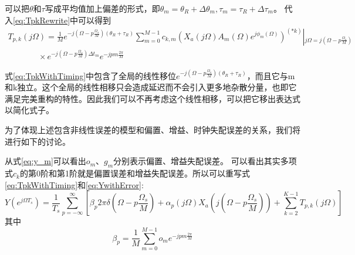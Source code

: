 		可以把$\theta $和$\tau $写成平均值加上偏差的形式，即${\theta _m} = {\theta _R} + \Delta {\theta _m},{\tau _m} = {\tau _R} + \Delta {\tau _m}$。
		代入\ref{eq:TpkRewrite}中可以得到
		 \begin{equation}
			\begin{array}{ccccc}
			{T_{p,k}}\left( {j\Omega } \right) = \frac{1}{M}{e^{ - j\left( {\Omega  - p\frac{{{\Omega _s}}}{M}} \right)\left( {{\theta _R} + {\tau _R}} \right)}}\sum\limits_{m = 0}^{M - 1} {{c_{k,m}}} {\left( {{X_a}\left( {j\Omega } \right){A_m}\left( \Omega  \right){e^{j{\phi _m}\left( \Omega  \right)}}} \right)^{\left( {*k} \right)}}\left| {_{j\Omega  = j\left( {\Omega  - p\frac{{{\Omega _s}}}{M}} \right)}} \right.\\
			\,\,\,\,\,\,\,\,\,\,\,\,\,\,\,\,\,\,\,\,\,\, \times {e^{ - j\left( {\Omega  - p\frac{{{\Omega _s}}}{M}} \right)\Delta {t_m}}}{e^{ - jpm\frac{{2\pi }}{M}}}
			\end{array}\label{eq:TpkWithTiming}
		\end{equation}
		
		式\ref{eq:TpkWithTiming}中包含了全局的线性移位${e^{ - j\left( {\Omega  - p\frac{{{\Omega _s}}}{M}} \right)\left( {{\theta _R} + {\tau _R}} \right)}}$，而且它与m和k独立。这个全局的线性相移只会造成延迟而不会引入更多地杂散分量，也即它满足完美重构的特性。因此我们可以不再考虑这个线性相移，可以把它移出表达式以简化式子。\par
		为了体现上述包含非线性误差的模型和偏置、增益、时钟失配误差的关系，我们将进行如下的讨论。\par
		从式\ref{eq:y_m}可以看出$o_m$、$g_m$分别表示偏置、增益失配误差。
		可以看出其实多项式$c_k$的第0阶和第1阶就是偏置误差和增益失配误差。所以可以重写式\ref{eq:TpkWithTiming}和\ref{eq:YwithError}:
		 \begin{equation}
			Y\left( {{e^{j\Omega {T_s}}}} \right) = \frac{1}{{{T_s}}}\sum\limits_{p =  - \infty }^\infty  {\left[ {{\beta _p}2\pi \delta \left( {\Omega  - p\frac{{{\Omega _s}}}{M}} \right) + {\alpha _p}\left( {j\Omega } \right){X_a}\left( {j\left( {\Omega  - p\frac{{{\Omega _s}}}{M}} \right)} \right) + \sum\limits_{k = 2}^{K - 1} {{T_{p,k}}\left( {j\Omega } \right)} } \right]} 
		\end{equation}
		其中
		\begin{equation}
			{\beta _p} = \frac{1}{M}\sum\limits_{m = 0}^{M - 1} {{o_m}{e^{ - jpm\frac{{2\pi }}{M}}}} 
		\end{equation}
		

